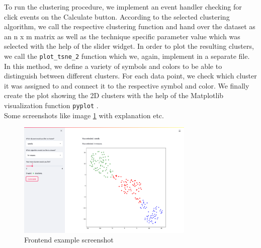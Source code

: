To run the clustering procedure, we implement an event handler checking for click events on the Calculate button. According to the selected clustering algorithm, we call the respective clustering function and hand over the dataset as an n x m matrix as well as the technique specific parameter value which was selected with the help of the slider widget.
In order to plot the resulting clusters, we call the \texttt{plot_tsne_2} function which we, again, implement in a separate file. In this method, we define a variety of symbols and colors to be able to distinguish between different clusters. For each data point, we check which cluster it was assigned to and connect it to the respective symbol and color. We finally create the plot showing the 2D clusters with the help of the Matplotlib visualization function \texttt{pyplot} \cite{Hunter:2007}.\\
Some screenshots like image \ref{img:frontend_screenshot_1} with explanation etc. 
\begin{figure}[H]
\caption{Frontend example screenshot}
%
\begin{center}
\includegraphics[width=0.75\textwidth]{images/frontend_beta_001.png}
\end{center}
\label{img:frontend_screenshot_1}
\end{figure}